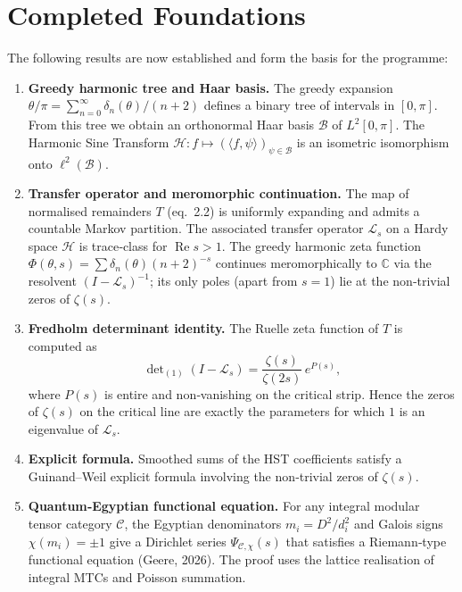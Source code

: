 \documentclass[11pt,a4paper]{article}
\begin{document}
\section{Completed Foundations}
The following results are now established and form the basis for the programme:
\begin{enumerate}[label=(\arabic*)]
    \item \textbf{Greedy harmonic tree and Haar basis.}
    The greedy expansion \(\theta/\pi = \sum_{n=0}^\infty \delta_n(\theta)/(n+2)\) defines a binary tree of intervals in \([0,\pi]\). From this tree we obtain an orthonormal Haar basis \(\mathcal{B}\) of \(L^2[0,\pi]\). The Harmonic Sine Transform \(\mathcal{H}:f\mapsto (\langle f,\psi\rangle)_{\psi\in\mathcal{B}}\) is an isometric isomorphism onto \(\ell^2(\mathcal{B})\).

    \item \textbf{Transfer operator and meromorphic continuation.}
    The map of normalised remainders \(T\) (eq.~2.2) is uniformly expanding and admits a countable Markov partition. The associated transfer operator \(\mathcal{L}_s\) on a Hardy space \(\mathcal{H}\) is trace‑class for \(\operatorname{Re}s>1\). The greedy harmonic zeta function \(\Phi(\theta,s)=\sum \delta_n(\theta)(n+2)^{-s}\) continues meromorphically to \(\mathbb{C}\) via the resolvent \((I-\mathcal{L}_s)^{-1}\); its only poles (apart from \(s=1\)) lie at the non‑trivial zeros of \(\zeta(s)\).

    \item \textbf{Fredholm determinant identity.}
    The Ruelle zeta function of \(T\) is computed as
    \[
    \det\nolimits_{(1)}(I-\mathcal{L}_s)=\frac{\zeta(s)}{\zeta(2s)}\,e^{P(s)},
    \]
    where \(P(s)\) is entire and non‑vanishing on the critical strip. Hence the zeros of \(\zeta(s)\) on the critical line are exactly the parameters for which \(1\) is an eigenvalue of \(\mathcal{L}_s\).

    \item \textbf{Explicit formula.}
    Smoothed sums of the HST coefficients satisfy a Guinand–Weil explicit formula involving the non‑trivial zeros of \(\zeta(s)\).

    \item \textbf{Quantum‑Egyptian functional equation.}
    For any integral modular tensor category \(\mathcal{C}\), the Egyptian denominators \(m_i=D^2/d_i^2\) and Galois signs \(\chi(m_i)=\pm1\) give a Dirichlet series \(\Psi_{\mathcal{C},\chi}(s)\) that satisfies a Riemann‑type functional equation (Geere, 2026). The proof uses the lattice realisation of integral MTCs and Poisson summation.
\end{enumerate}
\end{document}
